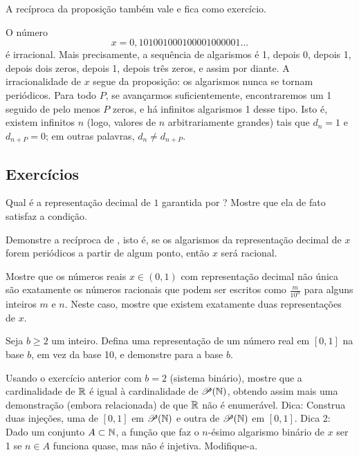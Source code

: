 A recíproca da proposição também vale e fica como exercício.

\begin{example}
O número
\begin{equation*}
x = 0{,}101001000100001000001\ldots
\end{equation*}
é irracional.
Mais precisamente, a sequência de algarismos é 1,
depois 0, depois 1, depois dois zeros, depois 1,
depois três zeros,
e assim por diante.
A irracionalidade de $x$ segue da
proposição: os algarismos nunca se tornam periódicos.
Para todo $P$,
se avançarmos suficientemente, encontraremos um 1 seguido de pelo menos
$P$ zeros, e há infinitos algarismos 1 desse tipo.
Isto é, existem infinitos $n$ (logo, valores de $n$ arbitrariamente grandes)
tais que $d_n=1$ e $d_{n+P}=0$; em outras palavras,
$d_n \neq d_{n+P}$.
\end{example}

\subsection{Exercícios}

\begin{exercise}[Fácil]
Qual é a representação decimal de $1$ garantida por
? Mostre que ela de fato satisfaz
a condição.
\end{exercise}

\begin{exercise}
Demonstre a recíproca de , isto é,
se os algarismos da representação decimal de $x$ forem periódicos a partir de algum ponto, então
$x$ será racional.
\end{exercise}

\begin{exercise} \label{exercise:nonuniquedecimals}
Mostre que os números reais $x \in (0,1)$ com representação decimal não única
são exatamente os números racionais que podem ser escritos
como $\frac{m}{10^n}$ para alguns inteiros $m$ e $n$. Neste caso, mostre que
existem exatamente duas representações de $x$.
\end{exercise}

\begin{exercise} \label{exercise:decimalpropbaseb}
Seja $b \geq 2$ um inteiro. Defina uma representação de um número real em
$[0,1]$ na base $b$, em vez da base 10, e demonstre
 para a base $b$.
\end{exercise}

\begin{exercise}
Usando o exercício anterior com $b=2$ (sistema binário),
mostre que a cardinalidade de ${\mathbb{R}}$ é igual à cardinalidade de ${\mathscr{P}}({\mathbb{N}})$,
obtendo assim mais uma demonstração (embora relacionada) de que ${\mathbb{R}}$ não é enumerável.
Dica: Construa duas injeções, uma de $[0,1]$ em ${\mathscr{P}}({\mathbb{N}})$
e outra de ${\mathscr{P}}({\mathbb{N}})$ em $[0,1]$. Dica 2: Dado um
conjunto $A \subset {\mathbb{N}}$, a função que faz o $n$-ésimo algarismo binário de $x$ ser 1 se
$n\in A$ funciona quase, mas não é injetiva. Modifique-a.
\end{exercise}

